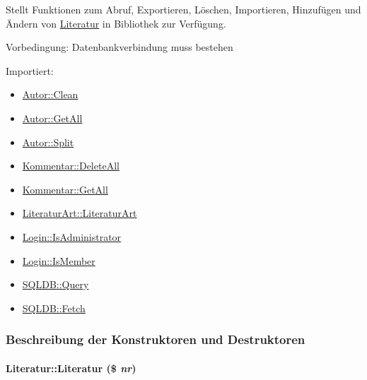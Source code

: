 Stellt Funktionen zum Abruf, Exportieren, Löschen, Importieren, Hinzufügen und Ändern von \hyperlink{classLiteratur}{Literatur} in Bibliothek zur Verfügung. \begin{Desc}
\item[Vorbedingung:]Datenbankverbindung muss bestehen \end{Desc}
\begin{Desc}
\item[Importiert:]\begin{itemize}
\item \hyperlink{classAutor_77b27af7e471abe5a404fc92c7319921}{Autor::Clean}\item \hyperlink{classAutor_79cd90084cab240919a5daecf39156a7}{Autor::Get\-All}\item \hyperlink{classAutor_2ba5418b6622f414fa8a054e6c2a2db8}{Autor::Split}\item \hyperlink{classKommentar_9903f1df98f71eefa3b44a81d6a8ee5c}{Kommentar::Delete\-All}\item \hyperlink{classKommentar_33d65db8c526c50017a5fa029bc04416}{Kommentar::Get\-All}\item \hyperlink{classLiteraturArt_b3312217430531ed7821a46a39c49af7}{Literatur\-Art::Literatur\-Art}\item \hyperlink{classLogin_6c120224aa6719f58c6ccd08acc28758}{Login::Is\-Administrator}\item \hyperlink{classLogin_70d2747b0aa454f4203a789afea25318}{Login::Is\-Member}\item \hyperlink{classSQLDB_fc6ffa8df50f68f07d9f5e3385b96d7a}{SQLDB::Query}\item \hyperlink{classSQLDB_a55c00ce1de0e50e0a58cae61892ba35}{SQLDB::Fetch} \end{itemize}
\end{Desc}




\subsubsection{Beschreibung der Konstruktoren und Destruktoren}
\hypertarget{classLiteratur_55626b912da4c041eaf981781ed6c640}{
\paragraph[Literatur]{\setlength{\rightskip}{0pt plus 5cm}Literatur::Literatur (\$ {\em nr})}\hfill}
\label{classLiteratur_55626b912da4c041eaf981781ed6c640}



